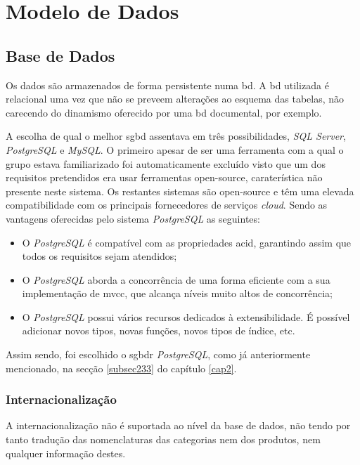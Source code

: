 \section{Modelo de Dados}\label{sec31}

%
%
\subsection{Base de Dados}\label{subsec311}

Os dados são armazenados de forma persistente numa \acrfull{bd}. A \acrshort{bd} utilizada é relacional uma vez que não se preveem alterações ao esquema das tabelas, não carecendo do dinamismo oferecido por uma \acrshort{bd} documental, por exemplo. 

A escolha de qual o melhor \acrfull{sgbd} assentava em três possibilidades, \textit{SQL Server}, \textit{PostgreSQL} e \textit{MySQL}. O primeiro apesar de ser uma ferramenta com a qual o grupo estava familiarizado foi automaticamente excluído visto que um dos requisitos pretendidos era usar ferramentas \gls{open-source}, caraterística não presente neste sistema. Os restantes sistemas são \gls{open-source} e têm uma elevada compatibilidade com os principais fornecedores de serviços \textit{cloud}. Sendo as vantagens oferecidas pelo sistema \textit{PostgreSQL} as seguintes:
\begin{itemize}
	\item O \textit{PostgreSQL} é compatível com as propriedades \acrfull{acid}, garantindo assim que todos os requisitos sejam atendidos;
	\item O \textit{PostgreSQL} aborda a concorrência de uma forma eficiente com a sua implementação de \acrfull{mvcc}, que alcança níveis muito altos de concorrência;
	\item O \textit{PostgreSQL} possui vários recursos dedicados à extensibilidade. É possível adicionar novos tipos, novas funções, novos tipos de índice, etc.
\end{itemize}
Assim sendo, foi escolhido o \acrfull{sgbdr} \textit{PostgreSQL}, como já anteriormente mencionado, na secção \ref{subsec233} do capítulo \ref{cap2}.

\subsubsection{Internacionalização}

A internacionalização não é suportada ao nível da base de dados, não tendo por tanto tradução das nomenclaturas das categorias nem dos produtos, nem qualquer informação destes. 

